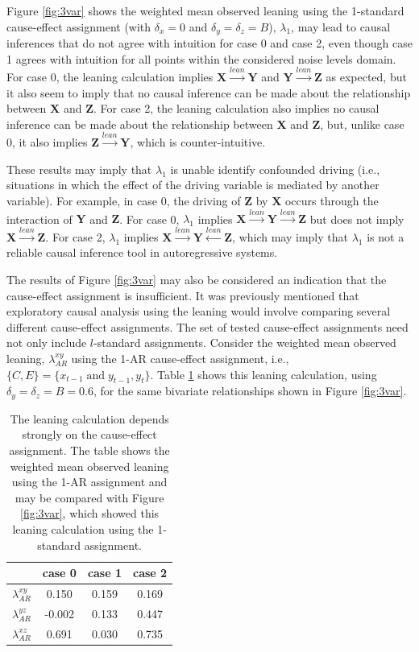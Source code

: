 \documentclass[twocolumn,aps,pre,groupedaddress]{revtex4-1}
\begin{document}
Figure \ref{fig:3var} shows the weighted mean observed leaning using the 1-standard cause-effect assignment (with $\delta_x = 0$ and $\delta_y = \delta_z = B$), $\lambda_1$, may lead to causal inferences that do not agree with intuition for case 0 and case 2, even though case 1 agrees with intuition for all points within the considered noise levels domain.  For case 0, the leaning calculation implies $\mathbf{X}\xrightarrow{lean}\mathbf{Y}$ and $\mathbf{Y}\xrightarrow{lean}\mathbf{Z}$ as expected, but it also seem to imply that no causal inference can be made about the relationship between $\mathbf{X}$ and $\mathbf{Z}$.  For case 2, the leaning calculation also implies no causal inference can be made about the relationship between $\mathbf{X}$ and $\mathbf{Z}$, but, unlike case 0, it also implies $\mathbf{Z}\xrightarrow{lean}\mathbf{Y}$, which is counter-intuitive.

These results may imply that $\lambda_1$ is unable identify confounded driving (i.e., situations in which the effect of the driving variable is mediated by another variable).  For example, in case 0, the driving of $\mathbf{Z}$ by $\mathbf{X}$ occurs through the interaction of $\mathbf{Y}$ and $\mathbf{Z}$.  For case 0, $\lambda_1$ implies $\mathbf{X}\xrightarrow{lean}\mathbf{Y}\xrightarrow{lean}\mathbf{Z}$ but does not imply $\mathbf{X}\xrightarrow{lean}\mathbf{Z}$.  For case 2, $\lambda_1$ implies $\mathbf{X}\xrightarrow{lean}\mathbf{Y}\xleftarrow{lean}\mathbf{Z}$, which may imply that $\lambda_1$ is not a reliable causal inference tool in autoregressive systems.

The results of Figure \ref{fig:3var} may also be considered an indication that the cause-effect assignment is insufficient.  It was previously mentioned that exploratory causal analysis using the leaning would involve comparing several different cause-effect assignments.  The set of tested cause-effect assignments need not only include $l$-standard assignments.  Consider the weighted mean observed leaning, $\lambda_{AR}^{xy}$ using the 1-AR cause-effect assignment, i.e., $\{C,E\} = \{x_{t-1}\;\mathrm{ and }\;y_{t-1},y_t\}$.  Table \ref{tab:3var} shows this leaning calculation, using $\delta_y=\delta_z=B=0.6$, for the same bivariate relationships shown in Figure \ref{fig:3var}.
\begin{table}
\begin{tabular}{lccc}
 & case 0 & case 1 & case 2\\
 \hline
 $\lambda_{AR}^{xy}$ & 0.150 & 0.159 & 0.169\\
 $\lambda_{AR}^{yz}$ & -0.002 & 0.133 & 0.447\\
 $\lambda_{AR}^{xz}$ & 0.691 & 0.030 & 0.735\\
\end{tabular}
\caption{The leaning calculation depends strongly on the cause-effect assignment.  The table shows the weighted mean observed leaning using the 1-AR assignment and may be compared with Figure \ref{fig:3var}, which showed this leaning calculation using the 1-standard assignment.}
\label{tab:3var}
\end{table}
\end{document}
